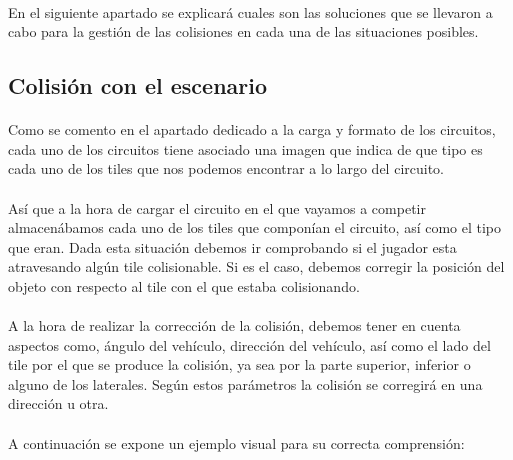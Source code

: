 \paragraph{}
En el siguiente apartado se explicará cuales son las soluciones que se llevaron a cabo para la gestión de las colisiones 
en cada una de las situaciones posibles.

\subsection{Colisión con el escenario}

\paragraph{}
Como se comento en el apartado dedicado a la carga y formato de los circuitos, cada uno de los circuitos tiene asociado una imagen
que indica de que tipo es cada uno de los tiles que nos podemos encontrar a lo largo del circuito.

\paragraph{}
Así que a la hora de cargar el circuito en el que vayamos a competir almacenábamos cada uno de los tiles que componían el circuito,
así como el tipo que eran. Dada esta situación debemos ir comprobando si el jugador esta atravesando algún tile colisionable. 
Si es el caso, debemos corregir la posición del objeto con respecto al tile con el que estaba colisionando.

\paragraph{}
A la hora de realizar la corrección de la colisión, debemos tener en cuenta aspectos como, ángulo del vehículo, dirección del 
vehículo, así como el lado del tile por el que se produce la colisión, ya sea por la parte superior, inferior o alguno 
de los laterales. Según estos parámetros la colisión se corregirá en una dirección u otra.

\paragraph{}
A continuación se expone un ejemplo visual para su correcta comprensión:

